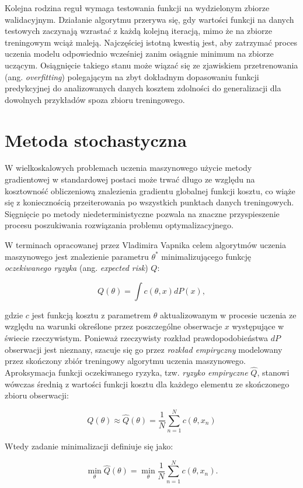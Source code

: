 \documentclass{pracamgr}
\begin{document}
Kolejna rodzina reguł wymaga testowania funkcji na wydzielonym zbiorze walidacyjnym. Działanie algorytmu przerywa się, gdy wartości funkcji na danych testowych zaczynają wzrastać z każdą kolejną iteracją, mimo że na zbiorze treningowym wciąż maleją. Najczęściej istotną kwestią jest, aby zatrzymać proces uczenia modelu odpowiednio wcześniej zanim osiągnie minimum na zbiorze uczącym. Osiągnięcie takiego stanu może wiązać się ze zjawiskiem przetrenowania (ang. \textit{overfitting}) polegającym na zbyt dokładnym dopasowaniu funkcji predykcyjnej do analizowanych danych kosztem zdolności do generalizacji dla dowolnych przykładów spoza zbioru treningowego.

\section{Metoda stochastyczna}
W wielkoskalowych problemach uczenia maszynowego użycie metody gradientowej w standardowej postaci może trwać długo ze względu na kosztowność obliczeniową znalezienia gradientu globalnej funkcji kosztu, co wiąże się z koniecznością przeiterowania po wszystkich punktach danych treningowych. Sięgnięcie po metody niedeterministyczne pozwala na znaczne przyspieszenie procesu poszukiwania rozwiązania problemu optymalizacyjnego.

W terminach  opracowanej przez Vladimira Vapnika celem algorytmów uczenia maszynowego jest znalezienie parametru $\theta^{\ast}$ minimalizującego funkcję \textit{oczekiwanego ryzyka} (ang. \textit{expected risk}) $Q$:

\[
Q(\theta) = \int c(\theta, x)dP(x),
\]

gdzie $c$ jest funkcją kosztu z parametrem $\theta$ aktualizowanym w procesie uczenia ze względu na warunki określone przez poszczególne obserwacje $x$ występujące w świecie rzeczywistym. Ponieważ rzeczywisty rozkład prawdopodobieństwa $dP$ obserwacji jest nieznany, szacuje się go przez \textit{rozkład empiryczny} modelowany przez skończony zbiór treningowy algorytmu uczenia maszynowego. Aproksymacja funkcji oczekiwanego ryzyka, tzw. \textit{ryzyko empiryczne} $\hat{Q}$, stanowi wówczas średnią z wartości funkcji kosztu dla każdego elementu ze skończonego zbioru obserwacji:

\[
Q(\theta) \approx \hat{Q}(\theta) = \frac{1}{N} \sum_{n = 1}^{N} c(\theta, x_n)
\]

Wtedy zadanie minimalizacji definiuje się jako:

\[
\min_{\theta} \hat{Q}(\theta) = \min_{\theta} \frac{1}{N} \sum_{n = 1}^{N} c(\theta, x_n).
\]
\end{document}
